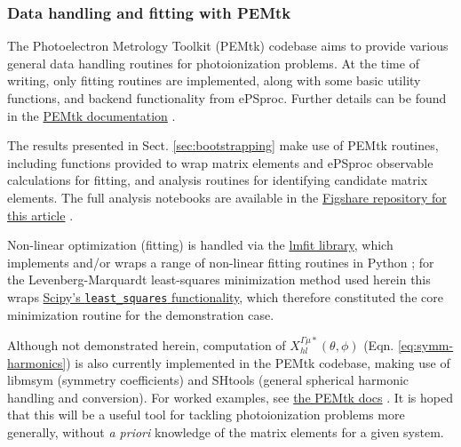 \subsubsection{Data handling and fitting with PEMtk}

The Photoelectron Metrology Toolkit (PEMtk) codebase \cite{hockett2021PEMtkDocs, hockett2021PEMtkGithub} aims to provide various general data handling routines for photoionization problems. At the time of writing, only fitting routines are implemented, along with some basic utility functions, and backend functionality from ePSproc. Further details can be found in the \href{https://pemtk.readthedocs.io/en/latest/about.html}{PEMtk documentation} \cite{hockett2021PEMtkDocs}.

The results presented in Sect. \ref{sec:bootstrapping} make use of PEMtk routines, including functions provided to wrap matrix elements and ePSproc observable calculations for fitting, and analysis routines for identifying candidate matrix elements. The full analysis notebooks are available in the \href{http://dx.doi.org/10.6084/m9.figshare.20293782}{Figshare repository for this article} \cite{hockett2022MFreconFigshare}.

Non-linear optimization (fitting) is handled via the \href{https://lmfit.github.io/lmfit-py/index.html}{lmfit library}, which implements and/or wraps a range of non-linear fitting routines in Python \cite{LMFITDocumentation, newville2014LMFITNonLinearLeastSquare}; for the Levenberg-Marquardt least-squares minimization method used herein this wraps \href{https://docs.scipy.org/doc/scipy/reference/generated/scipy.optimize.least_squares.html}{Scipy's \verb+least_squares+ functionality}, which therefore constituted the core minimization routine \cite{SciPyDocumentation} for the demonstration case.

Although not demonstrated herein, computation of $X_{hl}^{\Gamma\mu*}(\theta,\phi)$ (Eqn. \ref{eq:symm-harmonics}) is also currently implemented in the PEMtk codebase, making use of libmsym \cite{johansson2017AutomaticProcedureGeneratinga, johansson2022LibmsymGithub} (symmetry coefficients) and SHtools \cite{wieczorek2018SHToolsToolsWorking,SHtoolsGithub} (general spherical harmonic handling and conversion). For worked examples, see \href{https://pemtk.readthedocs.io/en/latest/sym/pemtk_symHarm_demo_160322_tidy.html}{the PEMtk docs} \cite{hockett2021PEMtkDocs}. It is hoped that this will be a useful tool for tackling photoionization problems more generally, without \textit{a priori} knowledge of the matrix elements for a given system.
